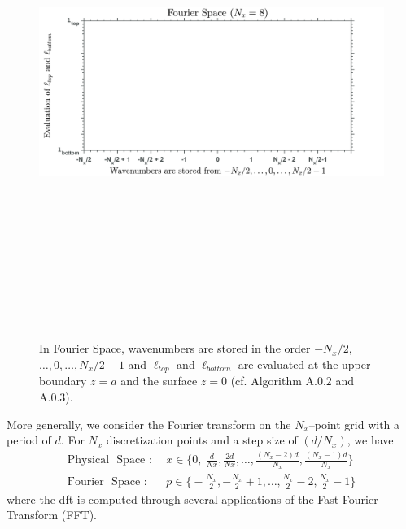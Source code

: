\vspace{-18mm}
\begin{figure}[H]
    \centering
    \includegraphics[width=16cm,height=16cm,keepaspectratio]{sections/other/matt_2.png}%
    \vspace{3mm}
    \caption{In Fourier Space, wavenumbers are stored in the order $-N_x/2,$ $\ldots,0,\ldots,N_x/2-1$ and $\ell_{top}$ and $\ell_{bottom}$ are evaluated at the upper boundary $z=a$ and the surface $z=0$ (cf. Algorithm $\text{A}.0.2$ and $\text{A}.0.3$).}
    \label{fig:fourier_space}%
\end{figure}
\vspace{-15mm}
More generally, we consider the Fourier transform on the $N_x$--point grid with a period of $d$. For $N_x$ discretization points and a step size of $(d/N_x)$, we have
\begin{align*}
\text{Physical ~Space :}&~~x\in\Big\{0,\
\frac{d}{Nx},\frac{2d}{Nx},\ldots,\frac{(N_x-2)d}{N_x},\frac{(N_x-1)d}{N_x}\Big\}   \\
\text{Fourier ~Space :}& ~~p\in\Big\{-\frac{N_x}{2},-\frac{N_x}{2}+1,\ldots,\frac{N_x}{2}-2,\frac{N_x}{2}-1\Big\}
\end{align*}
where the \gls{dft} is computed through several applications of the Fast Fourier Transform (FFT).